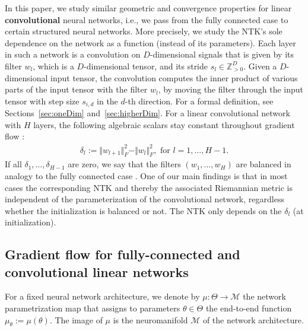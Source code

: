 \documentclass[twoside]{article}
\theoremstyle{definition}
\theoremstyle{remark}
\begin{document}
In this paper, we study similar geometric and convergence properties for linear \textbf{convolutional} neural networks, i.e., we pass from the fully connected case to certain structured neural networks. More precisely, we study the NTK's sole dependence on the network as a function (instead of its parameters).
Each layer in such a network is a convolution on $D$-dimensional signals that is given by its filter $w_l$, which is a $D$-dimensional tensor, and its stride $s_l \in \mathbb{Z}_{>0}^D$.
Given a $D$-dimensional input tensor, the convolution computes the inner product of various parts of the input tensor with the filter $w_l$, by moving the filter through the input tensor with step size $s_{i,d}$ in the $d$-th direction. 
For a formal definition, see Sections~\ref{sec:oneDim} and~\ref{sec:higherDim}.
For a linear convolutional network with $H$ layers, the following algebraic scalars stay constant throughout gradient flow \cite[Prop. 5.13]{kohn2022geometry}:
\begin{align}
    \label{eq:InvConvolution}
    \delta_l := \Vert w_{l+1} \Vert_F^2 -  \Vert w_{l} \Vert_F^2, \text{ for } l = 1, \ldots, H-1.
\end{align}
If all $\delta_1, \ldots, \delta_{H-1}$ are zero, we say that the filters $(w_1, \ldots, w_H)$ are balanced in analogy to the fully connected case \cite{arora2018optimization,bah2022learning}.
One of our main findings is that in most cases the corresponding NTK and thereby the associated Riemannian metric is independent of the parameterization of the convolutional network, regardless whether the initialization is balanced or not. The NTK only depends on the $\delta_l$ (at initialization).




\subsection{Gradient flow for fully-connected and convolutional linear networks }
\label{sec:learning-networks}

For a fixed neural network architecture, we denote by $\mu: \Theta \to \mathcal{M}$ the network parametrization map that assigns to parameters $\theta \in \Theta$ the end-to-end function $\mu_\theta:= \mu(\theta)$.
The image of $\mu$ is the neuromanifold $\mathcal{M}$ of the network architecture.
\end{document}
